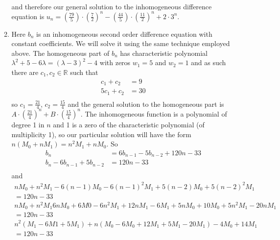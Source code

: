 \documentclass[10pt]{article}
\begin{document}
\begin{enumerate}
\begin{enumerate}
\begin{align*}
                \end{align*}
                and therefore our general solution to the inhomogeneous
                difference equation is
                        $u_n = (\tfrac{79}{5})\cdot(\tfrac{7}{2})^n - (\tfrac{44}{5})\cdot(\tfrac{11}{2})^n + 2\cdot3^n.$
            \item Here $b_n$ is an inhomogeneous second order difference
                equation with constant coefficients. We will solve it using the
                same technique employed above. The homogeneous part of $b_n$ has
                characteristic polynomial $\lambda^2 + 5 - 6\lambda = (\lambda - 3)^2 - 4$
                with zeros $w_1 = 5$ and $w_2 = 1$ and as such there are
                $c_1, c_2 \in \mathbb{R}$ such that
                \begin{align*}
                    c_1 + c_2 &= 9 \\
                    5c_1 + c_2 &= 30 \\
                \end{align*}
                so $c_1 = \frac{21}{4}$,  $c_2 = \frac{15}{4}$ and the general
                solution to the homogeneous part is $A\cdot(\frac{21}{4})^n + B\cdot(\frac{15}{4})^n$.
                The inhomogeneous function is a polynomial of degree 1 in $n$
                and 1 is a zero of the characteristic polynomial (of
                multiplicity 1), so our particular solution will have the form
                $n(M_0 + nM_1) = n^2M_1 + nM_0$. So
                \begin{align*}
                    b_n &= 6b_{n - 1} -  5b_{n - 2} +120n - 33 \\
                    b_n - 6b_{n - 1} + 5b_{n - 2} &= 120n - 33 \\
                \end{align*}
                and
                \begin{align*}
                    nM_0 + n^2M_1 - 6(n - 1)M_0 - 6(n - 1)^2M_1 + 5(n - 2)M_0 + 5(n - 2)^2M_1 \\ = 120n - 33 \\
                    nM_0 + n^2M_1 6nM_0 + 6M0 - 6n^2M_1 + 12nM_1 - 6M_1 + 5nM_0 + 10M_0 + 5n^2M_1 - 20nM_1 \\ = 120n - 33 \\
                    n^2(M_1 - 6M1 + 5M_1) + n(M_0 - 6M_0 + 12M_1 + 5M_1 - 20M_1) - 4M_0 + 14M_1 \\ = 120n - 33 \\
                \end{align*}

\end{enumerate}
\end{enumerate}
\end{document}
